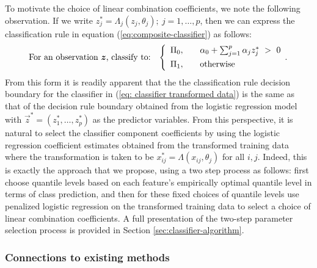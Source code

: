 To motivate the choice of linear combination coefficients, we note the following
observation.  If we write
$z_j^{*} = \Lambda_j (z_j, \theta_j);~ j = 1, \dots, p$, then we can express the
classification rule in equation (\ref{eq:composite-classifier}) as follows:
\begin{equation}
  \label{eq: classifier transformed data}
  \text{For an observation $\vec{z}$, classify to:} \hspace{3mm} \left\{ 
    \begin{array}{lcl}
      \Pi_0, & & \alpha_0 + \sum_{j = 1}^p \alpha_j z_j^{*} ~>~ 0 \\[1ex]
      \Pi_1, & & \text{otherwise} \\[0ex]
    \end{array} .
  \right.
\end{equation}
From this form it is readily apparent that the the classification rule decision
boundary for the classifier in (\ref{eq: classifier transformed data}) is the
same as that of the decision rule boundary obtained from the logistic regression
model with $\vec{z}^{*} = (z_1^{*}, \dots, z_p^{*})$ as the predictor variables.
From this perspective, it is natural to select the classifier component
coefficients by using the logistic regression coefficient estimates obtained
from the transformed training data where the transformation is taken to be
$x_{ij}^{*} = \Lambda(x_{ij}, \theta_j)$ for all $i, j$.  Indeed, this is
exactly the approach that we propose, using a two step process as follows: first
choose quantile levels based on each feature's empirically optimal quantile
level in terms of class prediction, and then for these fixed choices of quantile
levels use penalized logistic regression on the transformed training data to
select a choice of linear combination coefficients.  A full presentation of the
two-step parameter selection process is provided in Section
\ref{sec:classifier-algorithm}.




\subsubsection{Connections to existing methods}
\label{sec:similarities-to-existing}

